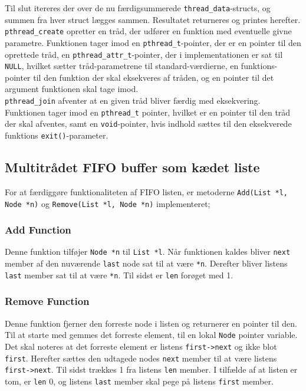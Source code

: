 Til slut itereres der over de nu færdigsummerede \texttt{thread\_data}-structs, og summen fra hver struct lægges sammen. Resultatet returneres og printes herefter. \\ 

\texttt{pthread\_create} opretter en tråd, der udfører en funktion med eventuelle givne parametre. 
Funktionen tager imod en \texttt{pthread\_t}-pointer, der er en pointer til den oprettede tråd, en \texttt{pthread\_attr\_t}-pointer, der i implementationen er sat til \texttt{NULL}, hvilket sætter tråd-parametrene til standard-værdierne, en funktions-pointer til den funktion der skal eksekveres af tråden, og en pointer til det argument funktionen skal tage imod. \\

\texttt{pthread\_join} afventer at en given tråd bliver færdig med eksekvering. 
Funktionen tager imod en \texttt{pthread\_t} pointer, hvilket er en pointer til den tråd der skal afventes, samt en \texttt{void}-pointer, hvis indhold sættes til den eksekverede funktions \texttt{exit()}-parameter.\\

\subsection{Multitrådet FIFO buffer som kædet liste}
\label{list}
For at færdiggøre funktionaliteten af FIFO listen, er metoderne \texttt{Add(List *l, Node *n)} og \texttt{Remove(List *l, Node *n)} implementeret;

\subsubsection{Add Function}
Denne funktion tilføjer \texttt{Node *n} til \texttt{List *l}. Når funktionen kaldes bliver \texttt{next} member af den nuværende \texttt{last} node sat til at være \texttt{*n}. Derefter bliver listens \texttt{last} member sat til at være \texttt{*n}. Til sidst er \texttt{len} forøget med 1.

\subsubsection{Remove Function}
Denne funktion fjerner den forreste node i listen og returnerer en pointer til den. Til at starte med gemmes det forreste element, til en lokal \texttt{Node} pointer variable. Det skal noteres at det forreste element er listens \texttt{first->next} og ikke blot \texttt{first}. Herefter sættes den udtagede nodes \texttt{next} member til at være listens \texttt{first->next}. Til sidst trækkes 1 fra listens \texttt{len} member. I tilfælde af at listen er tom, er \texttt{len} 0, og listens \texttt{last} member skal pege på listens \texttt{first} member. \\

